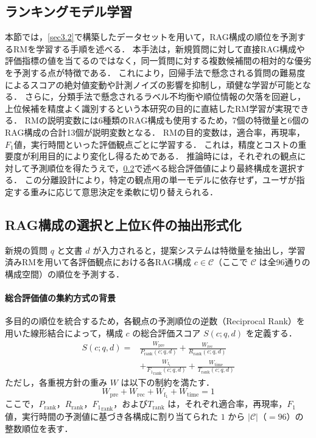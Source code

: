 \subsection{ランキングモデル学習} \label{sec3.3}
本節では，\ref{sec3.2}で構築したデータセットを用いて，RAG構成の順位を予測するRMを学習する手順を述べる．
本手法は，新規質問に対して直接RAG構成や評価指標の値を当てるのではなく，同一質問に対する複数候補間の相対的な優劣を予測する点が特徴である．
これにより，回帰手法で懸念される質問の難易度によるスコアの絶対値変動や計測ノイズの影響を抑制し，頑健な学習が可能となる．
さらに，分類手法で懸念されるラベル不均衡や順位情報の欠落を回避し，上位候補を精度よく識別するという本研究の目的に直結したRM学習が実現できる．
RMの説明変数には6種類のRAG構成も使用するため，7個の特徴量と6個のRAG構成の合計13個が説明変数となる．
RMの目的変数は，適合率，再現率，$F_1$値，実行時間といった評価観点ごとに学習する．
これは，精度とコストの重要度が利用目的により変化し得るためである．
推論時には，それぞれの観点に対して予測順位を得たうえで，\ref{sec3.4}で述べる総合評価値により最終構成を選択する．
この分離設計により，特定の観点用の単一モデルに依存せず，ユーザが指定する重みに応じて意思決定を柔軟に切り替えられる．

\subsection{RAG構成の選択と上位K件の抽出形式化} \label{sec3.4}
新規の質問 $q$ と文書 $d$ が入力されると，提案システムは特徴量を抽出し，学習済みRMを用いて各評価観点における各RAG構成 $c \in \mathcal{C}$（ここで $\mathcal{C}$ は全96通りの構成空間）の順位を予測する．

\paragraph{総合評価値の集約方式の背景}
多目的の順位を統合するため，各観点の予測順位の逆数（Reciprocal Rank）を用いた線形結合によって，構成 $c$ の総合評価スコア $S(c; q, d)$ を定義する．
\begin{equation}
 \begin{aligned}
    S(c; q, d) = & \frac{W_{\mathrm{pre}}}{P_{\mathrm{rank}}(c; q, d)} + \frac{W_{\mathrm{rec}}}{R_{\mathrm{rank}}(c;
  q, d)} \\
    & + \frac{W_{\mathrm{f_1}}}{{F_1}_{\mathrm{rank}}(c; q, d)} + \frac{W_{\mathrm{time}}}{T_{\mathrm{rank}}(c; q,
  d)}
    \end{aligned}
\label{eq1}
\end{equation}
ただし，各重視方針の重み $W$ は以下の制約を満たす．
\begin{equation}
W_{\mathrm{pre}} + W_{\mathrm{rec}} + W_{\mathrm{f_1}} + W_{\mathrm{time}} = 1
\label{eq2}
\end{equation}
ここで，$P_{\mathrm{rank}}$，$R_{\mathrm{rank}}$，${F_1}_{\mathrm{rank}}$，および$T_{\mathrm{rank}}$ は，それぞれ適合率，再現率，$F_1$値，実行時間の予測値に基づき各構成に割り当てられた $1$ から $|\mathcal{C}|$（$=96$）の整数順位を表す．

